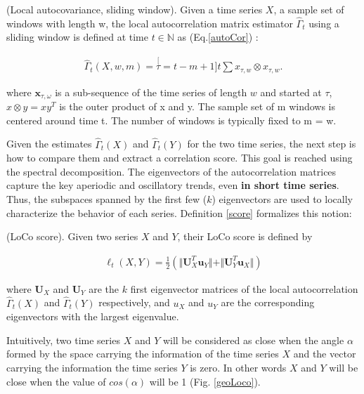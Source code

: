 \begin{definition}
(Local autocovariance, sliding window). Given a time series $X$, a sample set of windows with length w, the local autocorrelation matrix estimator $\hat{\Gamma}_{t}$ using a sliding window is defined at time $t \in \mathbb{N} $ as (Eq.\ref{autoCor}) : 

\begin{eqnarray}
\hat{\varGamma}_{t}(X,w,m)=\stackrel[\tau=t-m+1]{t}{\sum}x_{\tau,w}\otimes x_{\tau,w}.
\label{autoCor}
\end{eqnarray}

where $\boldsymbol{x}_{\tau,\omega}$ is a sub-sequence of the time series of length $w$ and started at $\tau$, $x \otimes y = xy^T$ is the outer product of x and y. The sample set of m windows is centered around time t.
 The number of windows is  typically fixed to m = w.
\end{definition}

Given the estimates $\hat{\Gamma}_{t}(X)$ and $\hat{\Gamma}_{t}(Y)$ for the two time series, the next step is how to compare them and extract a correlation score. This goal is reached using the spectral decomposition. The eigenvectors of the autocorrelation matrices capture the key aperiodic and oscillatory trends, even \textbf{in short time series}.  Thus, the subspaces spanned by the first few ($k$) eigenvectors are used  to locally characterize the behavior of each series. Definition \ref{score} formalizes this notion: 


\begin{definition}
\label{score}
(LoCo score). Given two series $X$ and $Y$, their LoCo score is defined by

\begin{eqnarray}
\ell_{t}(X,Y)=\frac{1}{2}(\Vert
\boldsymbol{U}_{X}^{T}\boldsymbol{u}_{Y}\Vert+\Vert
\boldsymbol{U}_{Y}^{T}\boldsymbol{u}_{X}\Vert)
\end{eqnarray}

\end{definition}    


where $\boldsymbol{U}_X$ and  $\boldsymbol{U}_Y$ are the $k$ first eigenvector
matrices of the local autocorrelation $\hat{\Gamma}_{t}(X)$ and
$\hat{\Gamma}_{t}(Y)$ respectively, and $u_X$  and $u_Y$  are the
corresponding eigenvectors with the largest eigenvalue. 


Intuitively, two time series $X$ and $Y$ will be considered as close when the angle
$\alpha$ formed by the space carrying the information of the time series $X$ and
the vector carrying the information the time series $Y$ is zero. In other words $X$
and $Y$ will be close when the value of  $cos(\alpha)$ will be 1 (Fig. \ref{geoLoco}). 

